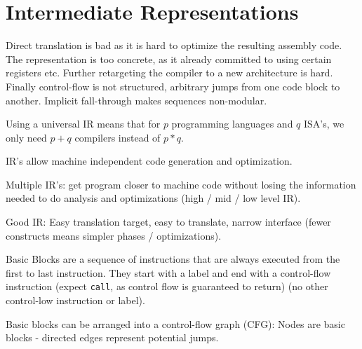\section*{Intermediate Representations}

Direct translation is bad as it is hard to optimize the resulting assembly code. The representation is too concrete, as it already committed to using certain registers etc. Further retargeting the compiler to a new architecture is hard. Finally control-flow is not structured, arbitrary jumps from one code block to another. Implicit fall-through makes sequences non-modular. \medskip

Using a universal IR means that for $p$ programming languages and $q$ ISA's, we only need $p + q$ compilers instead of $p * q$. \medskip

IR's allow machine independent code generation and optimization.\medskip
	
Multiple IR's: get program closer to machine code without losing the information needed to do analysis and optimizations (high / mid / low level IR).\medskip
		
Good IR: Easy translation target, easy to translate, narrow interface (fewer constructs means simpler phases / optimizations).\medskip
	
Basic Blocks are a sequence of instructions that are always executed from the first to last instruction. They start with a label and end with a control-flow instruction (expect \texttt{call}, as control flow is guaranteed to return) (no other control-low instruction or label).\medskip
	
Basic blocks can be arranged into a control-flow graph (CFG): Nodes are basic blocks - directed edges represent potential jumps.
